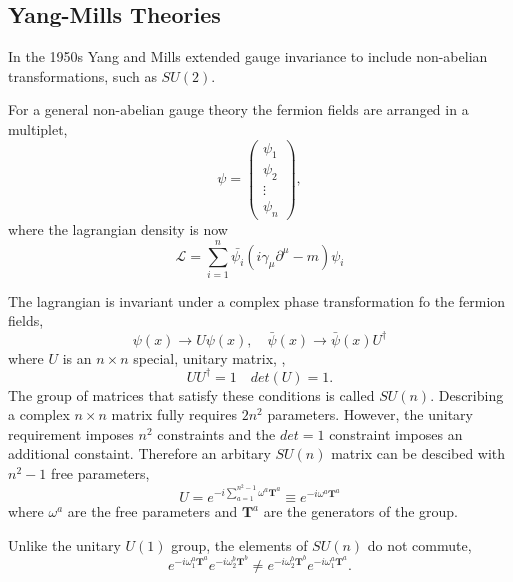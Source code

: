 \subsection{Yang-Mills Theories}
In the 1950s Yang and Mills extended gauge invariance to include non-abelian
transformations, such as $SU(2)$.

For a general non-abelian gauge theory the fermion fields are arranged in a
multiplet,
\begin{equation}
\psi = 
 \begin{pmatrix}
  \psi_{1} \\
  \psi_{2} \\
  \vdots  \\
  \psi_{n}
 \end{pmatrix} ,
\end{equation}
where the lagrangian density is now
\begin{equation}
\mathcal{L} 
= \sum_{i=1}^{n}
\bar{\psi_i} 
(i\gamma_{\mu} \partial^{\mu} - m) 
\psi_i 
\end{equation}

The lagrangian is invariant under a complex phase transformation fo the fermion
fields,
\begin{equation}
\psi(x) \to U \psi(x), \quad 
\bar{\psi}(x) \to \bar{\psi}(x) U^{\dagger}
\end{equation}
where $U$ is an $n\times n$ special, unitary matrix, \ie,
\begin{equation}
U U^{\dagger} = 1 \quad 
det(U) = 1.
\end{equation}
The group of matrices that satisfy these conditions is called $SU(n)$. 
Describing a complex $n\times n$ matrix fully requires $2n^{2}$ parameters.
However, the unitary requirement imposes $n^{2}$ constraints and the $det = 1$
constraint imposes an additional constaint. Therefore an arbitary $SU(n)$ matrix
can be descibed with $n^{2}-1$ free parameters,
\begin{equation}
U  = e^{-i \sum_{a=1}^{n^{2}-1} \omega^{a}\mathbf{T}^{a}}
\equiv e^{-i\omega^{a}\mathbf{T}^{a}}
\end{equation}
where $\omega^a$ are the free parameters and $\mathbf{T}^{a}$ are the generators
of the group.

Unlike the unitary $U(1)$ group, the elements of $SU(n)$ do not commute,
\begin{equation}
e^{-i\omega_1^{a}\mathbf{T}^{a}}
e^{-i\omega_2^{b}\mathbf{T}^{b}}
\neq
e^{-i\omega_2^{b}\mathbf{T}^{b}}
e^{-i\omega_1^{a}\mathbf{T}^{a}}.
\end{equation}

